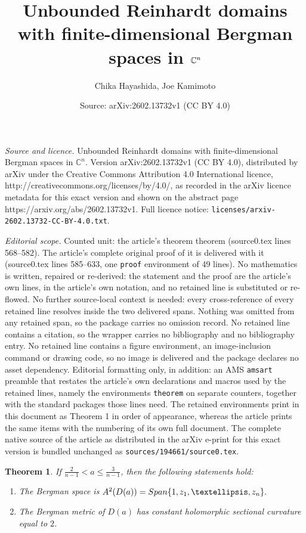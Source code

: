 \documentclass[10pt,a4paper]{amsart}
\title{Unbounded Reinhardt domains with finite-dimensional Bergman spaces in $\C^n$}
\author{Chika Hayashida, Joe Kamimoto}
\date{Source: arXiv:2602.13732v1 (CC BY 4.0)}
\newtheorem{theorem}{Theorem}
\newcommand{\C}{{\mathbb C}}
\begin{document}
\maketitle

\noindent\emph{Source and licence.} Unbounded Reinhardt domains with finite-dimensional Bergman spaces in $\C^n$. Version arXiv:2602.13732v1 (CC BY 4.0), distributed by arXiv under the Creative Commons Attribution 4.0 International licence, http://creativecommons.org/licenses/by/4.0/, as recorded in the arXiv licence metadata for this exact version and shown on the abstract page https://arxiv.org/abs/2602.13732v1. Full licence notice: \texttt{licenses/arxiv-2602.13732-CC-BY-4.0.txt}.\par\smallskip

\noindent\textit{Editorial scope.} Counted unit: the article's theorem theorem (source0.tex lines 568--582). The article's complete original proof of it is delivered with it (source0.tex lines 585--633, one \texttt{proof} environment of 49 lines). No mathematics is written, repaired or re-derived: the statement and the proof are the article's own lines, in the article's own notation, and no retained line is substituted or re-flowed.  No further source-local context is needed: every cross-reference of every retained line resolves inside the two delivered spans.  Nothing was omitted from any retained span, so the package carries no omission record.  No retained line contains a citation, so the wrapper carries no bibliography and no bibliography entry.  No retained line contains a figure environment, an image-inclusion command or drawing code, so no image is delivered and the package declares no asset dependency.  Editorial formatting only, in addition: an AMS \texttt{amsart} preamble that restates the article's own declarations and macros used by the retained lines, namely the environments \texttt{theorem} on separate counters, together with the standard packages those lines need.  The retained environments print in this document as Theorem 1 in order of appearance, whereas the article prints the same items with the numbering of its own full document.  The complete native source of the article as distributed in the arXiv e-print for this exact version is bundled unchanged as \texttt{sources/194661/source0.tex}.
\begin{theorem}
If 
$\frac{2}{n-1}<a\leq\frac{3}{n-1}$,
then the following statements hold: 
\begin{enumerate}
\item
The Bergman space is 
$A^2(D(a))={\rm Span}\{1,z_1,\ldots,z_n\}.$
\item
The Bergman metric of $D(a)$ has constant 
holomorphic sectional curvature equal to $2$.
\end{enumerate}
\end{theorem}
\end{document}

